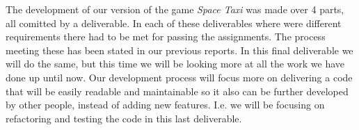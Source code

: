 The development of our version of the game \textit{Space Taxi} was made over 4 parts, all comitted by a deliverable. In each of these deliverables where were different requirements there had to be met for passing the assignments. The process meeting these has been stated in our previous reports. In this final deliverable we will do the same, but this time we will be looking more at all the work we have done up until now. Our development process will focus more on delivering a code that will be easily readable and maintainable so it also can be further developed by other people, instead of adding new features. I.e. we will be focusing on refactoring and testing the code in this last deliverable.





